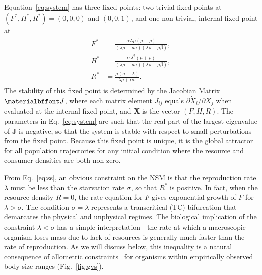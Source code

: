 \documentclass{pnastwo}
\begin{document}
\begin{article}
Equation~\eqref{eq:system} has three fixed points: two trivial fixed points
at $(F^*,H^*,R^*)=(0,0,0)$ and $(0,0,1)$, and one non-trivial, internal
fixed point at
\begin{eqnarray}
\label{eq:ss}
\begin{split}
F^* &= \frac{\alpha  \lambda  \mu  (\mu +\rho )}{(\lambda  \rho +\mu  \sigma ) (\lambda  \rho +\mu  \beta)}, \\
H^* &= \frac{\alpha  \lambda ^2 (\mu +\rho )}{(\lambda  \rho +\mu  \sigma ) (\lambda  \rho +\mu  \beta)}, \\
R^* &= \frac{\mu  (\sigma -\lambda )}{\lambda  \rho +\mu  \sigma }.
\end{split}
\end{eqnarray}
The stability of this fixed point is determined by the Jacobian Matrix
$\bf J$, where each matrix element $J_{ij}$ equals
$\partial{\dot X_i}/\partial{X_j}$ when evaluated at the internal fixed
point, and $\mathbf{X}$ is the vector $(F,H,R)$.  The parameters in
Eq.~\eqref{eq:system} are such that the real part of the largest eigenvalue
of $\mathbf{J}$ is negative, so that the system is stable with respect to
small perturbations from the fixed point.  Because this fixed point is
unique, it is the global attractor for all population trajectories for any
initial condition where the resource and consumer densities are both non
zero.

From Eq.~\eqref{eq:ss}, an obvious constraint on the NSM is that the
reproduction rate $\lambda$ must be less than the starvation rate $\sigma$,
so that $R^*$ is positive.  In fact, when the resource density $R=0$, the
rate equation for $F$ gives exponential growth of $F$ for $\lambda>\sigma$.
The condition $\sigma = \lambda$ represents a transcritical (TC) bifurcation
that demarcates the physical and unphysical regimes.  The
biological implication of the constraint $\lambda<\sigma$ has a simple
interpretation---the rate at which a macroscopic organism loses mass due to
lack of resources is generally much faster than the rate of reproduction.  As
we will discuss below, this inequality is a natural consequence of allometric
constraints~\cite{Kempes:2012hy} for organisms within empirically observed
body size ranges (Fig.~\ref{fig:gvs}).


\end{article}
\end{document}
